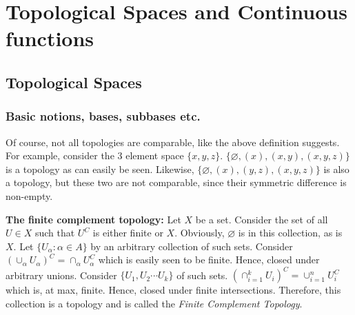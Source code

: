 \documentclass[main.tex]{subfiles}
\begin{document}
\chapter{Topological Spaces and Continuous functions}
\section{Topological Spaces}
\subsection{Basic notions, bases, subbases etc.}
\begin{remark}
    Of course, not all topologies are comparable, like the above definition suggests. For example, consider the 3 element space $\{x,y,z\}$. $\{\varnothing,(x),(x,y),(x,y,z)\}$ is a topology as can easily be seen. Likewise, $\{\varnothing,(x),(y,z),(x,y,z)\}$ is also a topology, but these two are not comparable, since their symmetric difference is non-empty.
\end{remark}
\begin{example}
    \textbf{The finite complement topology:} Let $X$ be a set. Consider the set of all $U \in X$ such that $U^C$ is either finite or $X$. Obviously, $\varnothing$ is in this collection, as is $X$. Let $\{U_{\alpha}:\alpha \in A\}$ by an arbitrary collection of such sets. Consider $(\cup_{\alpha} U_{\alpha})^C=\cap_{\alpha} U^{C}_{\alpha}$ which is easily seen to be finite. Hence, closed under arbitrary unions.
    Consider $\{U_1,U_2 \cdots U_k\}$ of such sets. $(\cap_{i=1}^{k}U_{i})^C=\cup_{i=1}^{n} U^{C}_i$ which is, at max, finite. Hence, closed under finite intersections. Therefore, this collection is a topology and is called the \emph{Finite Complement Topology}.
\end{example}
\end{document}
